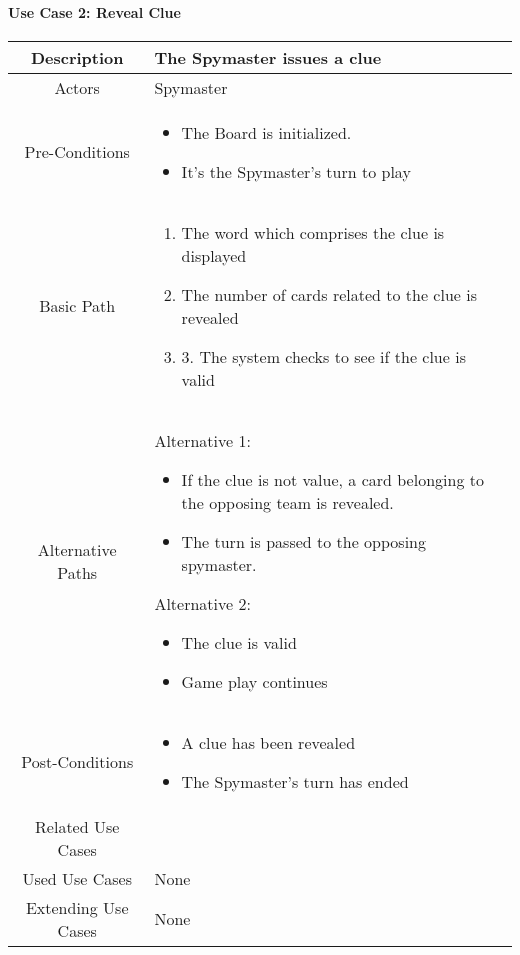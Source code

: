 \documentclass[12pt, a4paper]{article}
\begin{document}
	\paragraph{Use Case 2: Reveal Clue}
		\begin{center}
		\begin{tabular}{ |c|p{7cm}| } 
			\hline
			Description & The Spymaster issues a clue \\ 
			\hline
			Actors & Spymaster \\
			\hline 
			Pre-Conditions & \begin{itemize}
				\item The Board is initialized.
				\item It's the Spymaster's turn to play  
			\end{itemize} \\
			\hline
			Basic Path & 
				\begin{enumerate}
					\item The word which comprises the clue is displayed 
					\item The number of cards related to the clue is revealed
					\item 3.	The system checks to see if the clue is valid 
				\end{enumerate} \\
			\hline 
			Alternative Paths & Alternative 1: \begin{itemize}
				\item If the clue is not value, a card belonging to the opposing team is revealed. 
				\item The turn is passed to the opposing spymaster.
			\end{itemize}
	
			Alternative 2:
			\begin{itemize}
			\item	The clue is valid
			\item 	Game play continues 
			\end{itemize}
			 \\
			\hline 
			Post-Conditions & 
				\begin{itemize}
					\item A clue has been revealed
					\item The Spymaster’s turn has ended 
				\end{itemize} \\
			\hline 
			Related Use Cases & \\
			\hline 
			Used Use Cases & None \\
			\hline
			Extending Use Cases & None \\
			\hline
		\end{tabular}
	\end{center}
		
\end{document}
